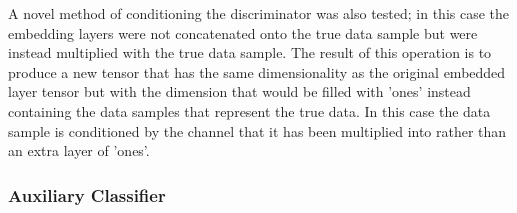 \documentclass[a4paper, titlepage]{article}
\begin{document}
\newline
\newline
A novel method of conditioning the discriminator was also tested; in this case the embedding layers were not concatenated onto the true data sample but were instead multiplied with the true data sample.
The result of this operation is to produce a new tensor that has the same dimensionality as the original embedded layer tensor but with the dimension that would be filled with 'ones' instead containing the data samples that represent the true data.
In this case the data sample is conditioned by the channel that it has been multiplied into rather than an extra layer of 'ones'.

\subsubsection{Auxiliary Classifier}
\end{document}
